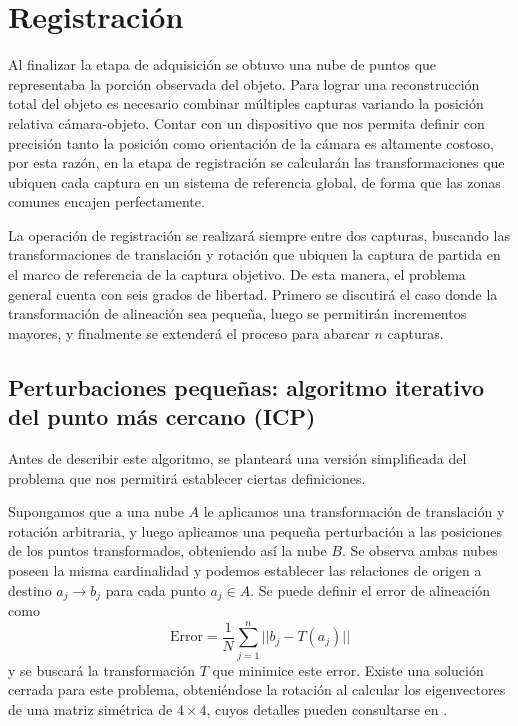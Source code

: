 \section{Registración}
Al finalizar la etapa de adquisición se obtuvo una nube de puntos
que representaba la porción observada del objeto.
Para lograr una reconstrucción total del objeto es necesario combinar múltiples capturas
variando la posición relativa cámara-objeto.
Contar con un dispositivo que nos permita definir con precisión
tanto la posición como orientación de la cámara es altamente costoso,
por esta razón, en la etapa de registración se calcularán las transformaciones que ubiquen cada
captura en un sistema de referencia global, de forma que las zonas comunes encajen perfectamente.


La operación de registración se realizará siempre entre dos capturas,
buscando las transformaciones de translación y rotación que ubiquen
la captura de partida en el marco de referencia de la captura objetivo.
De esta manera, el problema general cuenta con seis grados de libertad.
Primero se discutirá el caso donde la transformación de alineación sea pequeña,
luego se permitirán incrementos mayores,
y finalmente se extenderá el proceso para abarcar $n$ capturas.



\subsection{Perturbaciones pequeñas: algoritmo iterativo del punto más cercano (ICP)}
Antes de describir este algoritmo, se planteará una versión simplificada del problema
que nos permitirá establecer ciertas definiciones.

Supongamos que a una nube $A$ le aplicamos una transformación de translación y rotación arbitraria,
y luego aplicamos una pequeña perturbación a las posiciones de los puntos transformados,
obteniendo así la nube $B$.
Se observa ambas nubes poseen la misma cardinalidad y podemos establecer las relaciones de origen a destino
$a_j \to b_j$ para cada punto $a_j \in A$.
Se puede definir el error de alineación como
\[
	\text{Error} = \frac{1}{N} \sum_{j=1}^n || b_j - T \left(a_j\right) ||
\]
y se buscará la transformación $T$ que minimice este error.
Existe una solución cerrada para este problema, obteniéndose la rotación al
calcular los eigenvectores de una matriz simétrica de $4\times4$,
cuyos detalles pueden consultarse en \cite{Horn87closed-formsolution}.

